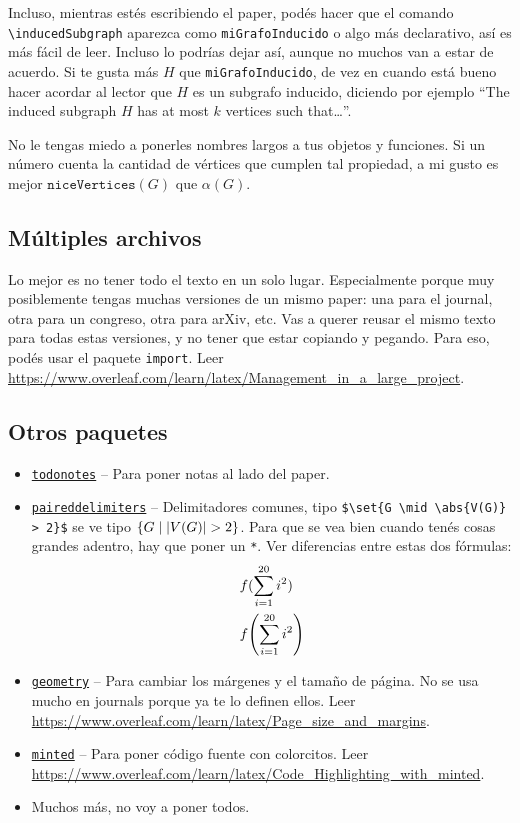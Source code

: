 \documentclass{article}
\begin{document}
Incluso, mientras estés escribiendo el paper, podés hacer que el comando \verb|\inducedSubgraph| aparezca como \texttt{miGrafoInducido} o algo más declarativo, así es más fácil de leer. Incluso lo podrías dejar así, aunque no muchos van a estar de acuerdo. Si te gusta más $H$ que \texttt{miGrafoInducido}, de vez en cuando está bueno hacer acordar al lector que $H$ es un subgrafo inducido, diciendo por ejemplo ``The induced subgraph $H$ has at most $k$ vertices such that\dots''.

No le tengas miedo a ponerles nombres largos a tus objetos y funciones. Si un número cuenta la cantidad de vértices que cumplen tal propiedad, a mi gusto es mejor $\mathtt{niceVertices}(G)$ que $\alpha(G)$.

\subsection{Múltiples archivos}
Lo mejor es no tener todo el texto en un solo lugar. Especialmente porque muy posiblemente tengas muchas versiones de un mismo paper: una para el journal, otra para un congreso, otra para arXiv, etc. Vas a querer reusar el mismo texto para todas estas versiones, y no tener que estar copiando y pegando. Para eso, podés usar el paquete \texttt{import}. Leer \url{https://www.overleaf.com/learn/latex/Management_in_a_large_project}.

\subsection{Otros paquetes}
\begin{itemize}
    \item\href{https://tug.ctan.org/macros/latex/contrib/todonotes/todonotes.pdf}{\texttt{todonotes}} -- Para poner notas al lado del paper.
    \item\href{https://github.com/ericbrandwein/latex-packages/tree/main/paireddelimiters}{\texttt{paireddelimiters}} -- Delimitadores comunes, tipo \verb|$\set{G \mid \abs{V(G)} > 2}$| se ve tipo $\{G \mid \lvert V(G)\rvert > 2\}$. Para que se vea bien cuando tenés cosas grandes adentro, hay que poner un \texttt{*}. Ver diferencias entre estas dos fórmulas:
    \begin{align*}
        &f\parens{\sum_{i = 1}^{20} i^2}\\
        &f\parens*{\sum_{i = 1}^{20} i^2}
    \end{align*}
    \item\href{https://texdoc.org/serve/geometry.pdf/0}{\texttt{geometry}} -- Para cambiar los márgenes y el tamaño de página. No se usa mucho en journals porque ya te lo definen ellos. Leer \url{https://www.overleaf.com/learn/latex/Page_size_and_margins}.
    \item\href{https://ctan.org/pkg/minted?lang=en}{\texttt{minted}} -- Para poner código fuente con colorcitos. Leer \url{https://www.overleaf.com/learn/latex/Code_Highlighting_with_minted}.
    \item Muchos más, no voy a poner todos.
\end{itemize}
\end{document}
